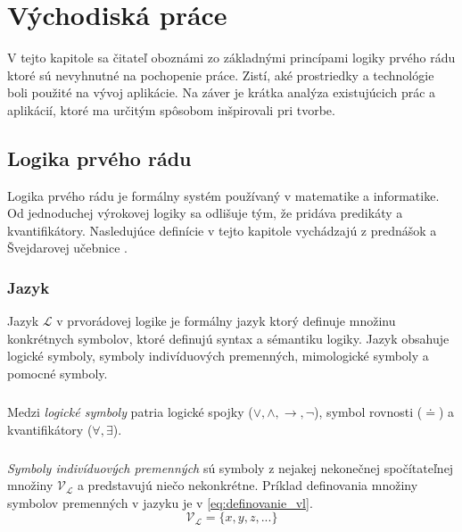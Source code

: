 \chapter{Východiská práce}
\label{kap:vychodiska} %

V tejto kapitole sa čitateľ oboznámi zo základnými princípami logiky prvého rádu ktoré sú nevyhnutné na pochopenie práce. Zistí, aké prostriedky a technológie boli použité na vývoj aplikácie. Na záver je krátka analýza existujúcich prác a aplikácií, ktoré ma určitým spôsobom inšpirovali pri tvorbe.

\section{Logika prvého rádu}
Logika prvého rádu je formálny systém používaný v matematike a informatike. Od jednoduchej výrokovej logiky sa odlišuje tým, že pridáva predikáty a kvantifikátory. Nasledujúce definície v tejto kapitole vychádzajú z prednášok \cite{prednasky} a Švejdarovej učebnice \cite{svejdar}.


\subsection{Jazyk}
Jazyk $\mathcal{L}$ v prvorádovej logike je formálny jazyk ktorý definuje množinu konkrétnych symbolov, ktoré definujú syntax a sémantiku logiky. Jazyk obsahuje logické symboly, symboly indivíduových premenných, mimologické symboly a pomocné symboly.

\paragraph{}
Medzi \emph{logické symboly} patria logické spojky ($\vee, \wedge, \to, \neg$), symbol rovnosti ($\doteq$) a kvantifikátory ($\forall, \exists$).

\paragraph{}
\emph{Symboly indivíduových premenných} sú symboly z nejakej nekonečnej spočítateľnej množiny $\mathcal{V}_\mathcal{L}$ a predstavujú niečo nekonkrétne. Príklad definovania množiny symbolov premenných v jazyku je v \ref{eq:definovanie_vl}.
\begin{equation} \label{eq:definovanie_vl}
\mathcal{V}_\mathcal{L} = \{x, y, z, ...\}
\end{equation}


